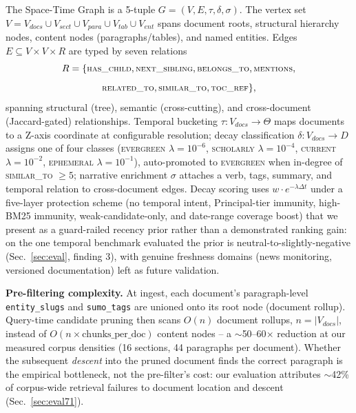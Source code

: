 \documentclass[conference,a4paper]{IEEEtran}
\begin{document}
The Space-Time Graph is a 5-tuple $G = (V, E, \tau, \delta, \sigma)$. The vertex set $V = V_{docs} \cup V_{sect} \cup V_{para} \cup V_{tab} \cup V_{ent}$ spans document roots, structural hierarchy nodes, content nodes (paragraphs/tables), and named entities. Edges $E \subseteq V \times V \times R$ are typed by seven relations
\begin{equation*}
\small
R = \{\textsc{has\_child}, \textsc{next\_sibling}, \textsc{belongs\_to}, \textsc{mentions},
\end{equation*}
\begin{equation*}
\small
\textsc{related\_to}, \textsc{similar\_to}, \textsc{toc\_ref}\},
\end{equation*}
spanning structural (tree), semantic (cross-cutting), and cross-document (Jaccard-gated) relationships. Temporal bucketing $\tau: V_{docs} \to \Theta$ maps documents to a Z-axis coordinate at configurable resolution; decay classification $\delta: V_{docs} \to D$ assigns one of four classes (\textsc{evergreen} $\lambda{=}10^{-6}$, \textsc{scholarly} $\lambda{=}10^{-4}$, \textsc{current} $\lambda{=}10^{-2}$, \textsc{ephemeral} $\lambda{=}10^{-1}$), auto-promoted to \textsc{evergreen} when in-degree of \textsc{similar\_to} $\geq 5$; narrative enrichment $\sigma$ attaches a verb, tags, summary, and temporal relation to cross-document edges. Decay scoring uses $w \cdot e^{-\lambda \Delta t}$ under a five-layer protection scheme (no temporal intent, Principal-tier immunity, high-BM25 immunity, weak-candidate-only, and date-range coverage boost) that we present as a guard-railed recency prior rather than a demonstrated ranking gain: on the one temporal benchmark evaluated the prior is neutral-to-slightly-negative (Sec.~\ref{sec:eval}, finding 3), with genuine freshness domains (news monitoring, versioned documentation) left as future validation.

\textbf{Pre-filtering complexity.} At ingest, each document's paragraph-level \texttt{entity\_slugs} and \texttt{sumo\_tags} are unioned onto its root node (document rollup). Query-time candidate pruning then scans $O(n)$ document rollups, $n = |V_{docs}|$, instead of $O(n \times \text{chunks\_per\_doc})$ content nodes -- a $\sim$50--60$\times$ reduction at our measured corpus densities (16 sections, 44 paragraphs per document). Whether the subsequent \emph{descent} into the pruned document finds the correct paragraph is the empirical bottleneck, not the pre-filter's cost: our evaluation attributes $\sim$42\% of corpus-wide retrieval failures to document location and descent (Sec.~\ref{sec:eval71}).
\end{document}
